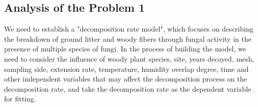 \subsection{Analysis of the Problem 1}
We need to establish a "decomposition rate model", which focuses on describing the breakdown of ground litter and woody fibers through fungal activity in the presence of multiple species of fungi. In the process of building the model, we need to consider the influence of woody plant species, site, years decayed, mesh, sampling side, extension rate, temperature, humidity overlap degree, time and other independent variables that may affect the decomposition process on the decomposition rate, and take the decomposition rate as the dependent variable for fitting.